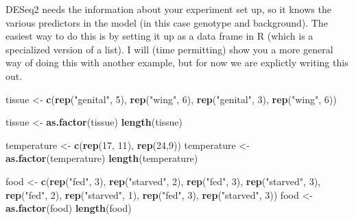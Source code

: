 \documentclass[
]{article}
\newenvironment{Shaded}{\begin{snugshade}}{\end{snugshade}}
\newcommand{\DecValTok}[1]{\textcolor[rgb]{0.00,0.00,0.81}{#1}}
\newcommand{\KeywordTok}[1]{\textcolor[rgb]{0.13,0.29,0.53}{\textbf{#1}}}
\newcommand{\NormalTok}[1]{#1}
\newcommand{\StringTok}[1]{\textcolor[rgb]{0.31,0.60,0.02}{#1}}
\begin{document}
DESeq2 needs the information about your experiment set up, so it knows
the various predictors in the model (in this case genotype and
background). The easiest way to do this is by setting it up as a data
frame in R (which is a specialized version of a list). I will (time
permitting) show you a more general way of doing this with another
example, but for now we are explictly writing this out.

\begin{Shaded}
\begin{Highlighting}[]
\NormalTok{tissue <-}\StringTok{ }\KeywordTok{c}\NormalTok{(}\KeywordTok{rep}\NormalTok{(}\StringTok{"genital"}\NormalTok{, }\DecValTok{5}\NormalTok{),}
            \KeywordTok{rep}\NormalTok{(}\StringTok{"wing"}\NormalTok{, }\DecValTok{6}\NormalTok{),}
            \KeywordTok{rep}\NormalTok{(}\StringTok{"genital"}\NormalTok{, }\DecValTok{3}\NormalTok{),}
            \KeywordTok{rep}\NormalTok{(}\StringTok{"wing"}\NormalTok{, }\DecValTok{6}\NormalTok{))}

\NormalTok{tissue <-}\StringTok{ }\KeywordTok{as.factor}\NormalTok{(tissue)}
\KeywordTok{length}\NormalTok{(tissue)}

\NormalTok{temperature <-}\StringTok{ }\KeywordTok{c}\NormalTok{(}\KeywordTok{rep}\NormalTok{(}\DecValTok{17}\NormalTok{, }\DecValTok{11}\NormalTok{), }\KeywordTok{rep}\NormalTok{(}\DecValTok{24}\NormalTok{,}\DecValTok{9}\NormalTok{))}
\NormalTok{temperature <-}\StringTok{ }\KeywordTok{as.factor}\NormalTok{(temperature)}
\KeywordTok{length}\NormalTok{(temperature)}

\NormalTok{food <-}\StringTok{ }\KeywordTok{c}\NormalTok{(}\KeywordTok{rep}\NormalTok{(}\StringTok{"fed"}\NormalTok{, }\DecValTok{3}\NormalTok{),}
          \KeywordTok{rep}\NormalTok{(}\StringTok{"starved"}\NormalTok{, }\DecValTok{2}\NormalTok{),}
          \KeywordTok{rep}\NormalTok{(}\StringTok{"fed"}\NormalTok{, }\DecValTok{3}\NormalTok{),}
          \KeywordTok{rep}\NormalTok{(}\StringTok{"starved"}\NormalTok{, }\DecValTok{3}\NormalTok{),}
          \KeywordTok{rep}\NormalTok{(}\StringTok{"fed"}\NormalTok{, }\DecValTok{2}\NormalTok{),}
          \KeywordTok{rep}\NormalTok{(}\StringTok{"starved"}\NormalTok{, }\DecValTok{1}\NormalTok{),}
          \KeywordTok{rep}\NormalTok{(}\StringTok{"fed"}\NormalTok{, }\DecValTok{3}\NormalTok{),}
          \KeywordTok{rep}\NormalTok{(}\StringTok{"starved"}\NormalTok{, }\DecValTok{3}\NormalTok{))}
\NormalTok{food <-}\StringTok{ }\KeywordTok{as.factor}\NormalTok{(food)}
\KeywordTok{length}\NormalTok{(food)}


\end{Highlighting}
\end{Shaded}
\end{document}
